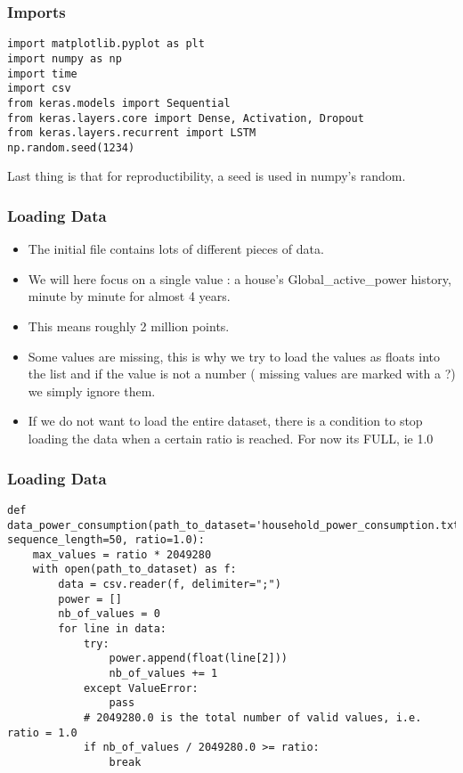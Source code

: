 \begin{frame}[fragile] \frametitle{Imports}

\begin{lstlisting}
import matplotlib.pyplot as plt
import numpy as np
import time
import csv
from keras.models import Sequential
from keras.layers.core import Dense, Activation, Dropout
from keras.layers.recurrent import LSTM
np.random.seed(1234)
\end{lstlisting}
Last thing is that for reproductibility, a seed is used in numpy's random.
\end{frame}

\begin{frame}[fragile] \frametitle{Loading Data}

\begin{itemize}
\item The initial file contains lots of different pieces of data. 
\item We will here focus on a single value : a house's Global\_active\_power history, minute by minute for almost 4 years. 
\item This means roughly 2 million points. 
\item Some values are missing, this is why we try to load the values as floats into the list and if the value is not a number ( missing values are marked with a ?)  we simply ignore them.
\item If we do not want to load the entire dataset, there is a condition to stop loading the data when a certain ratio is reached. For now its FULL, ie 1.0
\end{itemize}
\end{frame}

\begin{frame}[fragile] \frametitle{Loading Data}

\begin{lstlisting}
def data_power_consumption(path_to_dataset='household_power_consumption.txt', sequence_length=50, ratio=1.0):
    max_values = ratio * 2049280
    with open(path_to_dataset) as f:
        data = csv.reader(f, delimiter=";")
        power = []
        nb_of_values = 0
        for line in data:
            try:
                power.append(float(line[2]))
                nb_of_values += 1
            except ValueError:
                pass
            # 2049280.0 is the total number of valid values, i.e. ratio = 1.0
            if nb_of_values / 2049280.0 >= ratio:
                break
\end{lstlisting}

\end{frame}

